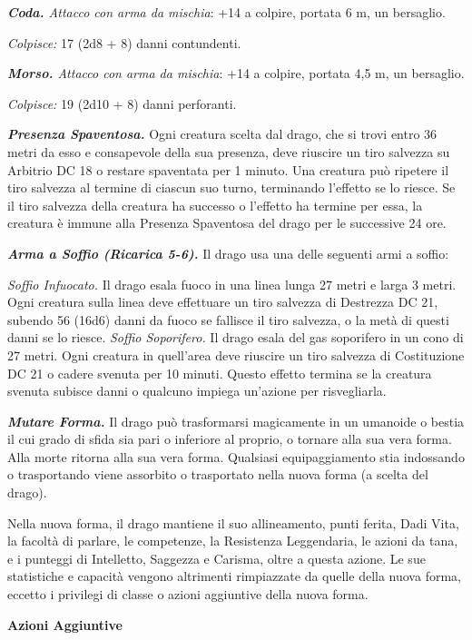 \begin{multicols}{2}
\emph{\textbf{Coda.} Attacco con arma da mischia}: +14 a colpire,
portata 6 m, un bersaglio.

\emph{Colpisce:} 17 (2d8 + 8) danni contundenti.

\emph{\textbf{Morso.} Attacco con arma da mischia}: +14 a colpire,
portata 4,5 m, un bersaglio.

\emph{Colpisce:} 19 (2d10 + 8) danni perforanti.

\emph{\textbf{Presenza Spaventosa.}} Ogni creatura scelta dal drago, che
si trovi entro 36 metri da esso e consapevole della sua presenza, deve
riuscire un tiro salvezza su Arbitrio DC 18 o restare spaventata per 1
minuto. Una creatura può ripetere il tiro salvezza al termine di ciascun
suo turno, terminando l'effetto se lo riesce. Se il tiro salvezza della
creatura ha successo o l'effetto ha termine per essa, la creatura è
immune alla Presenza Spaventosa del drago per le successive 24 ore.

\emph{\textbf{Arma a Soffio (Ricarica 5-6).}} Il drago usa una delle
seguenti armi a soffio:

\emph{Soffio Infuocato.} Il drago esala fuoco in una linea lunga 27
metri e larga 3 metri. Ogni creatura sulla linea deve effettuare un tiro
salvezza di Destrezza DC 21, subendo 56 (16d6) danni da fuoco se
fallisce il tiro salvezza, o la metà di questi danni se lo riesce.
\emph{Soffio Soporifero.} Il drago esala del gas soporifero in un cono
di 27 metri. Ogni creatura in quell'area deve riuscire un tiro salvezza
di Costituzione DC 21 o cadere svenuta per 10 minuti. Questo effetto
termina se la creatura svenuta subisce danni o qualcuno impiega
un'azione per risvegliarla.

\emph{\textbf{Mutare Forma.}} Il drago può trasformarsi magicamente in
un umanoide o bestia il cui grado di sfida sia pari o inferiore al
proprio, o tornare alla sua vera forma. Alla morte ritorna alla sua vera
forma. Qualsiasi equipaggiamento stia indossando o trasportando viene
assorbito o trasportato nella nuova forma (a scelta del drago).

Nella nuova forma, il drago mantiene il suo allineamento, punti ferita,
Dadi Vita, la facoltà di parlare, le competenze, la Resistenza
Leggendaria, le azioni da tana, e i punteggi di Intelletto, Saggezza e
Carisma, oltre a questa azione. Le sue statistiche e capacità vengono
altrimenti rimpiazzate da quelle della nuova forma, eccetto i privilegi
di classe o azioni aggiuntive della nuova forma.

\textbf{Azioni Aggiuntive}


\end{multicols}
